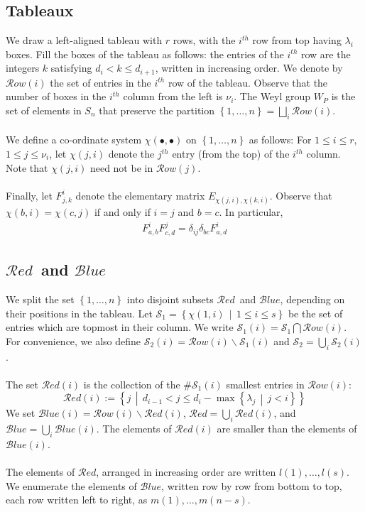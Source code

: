 \documentclass[paper=a4, fontsize=10pt]{amsart} %
\theoremstyle{plain}
\theoremstyle{definition}
\theoremstyle{remark}
\numberwithin{equation}{section} %
\numberwithin{figure}{section} %
\numberwithin{table}{section} %
\numberwithin{subsection}{section} %
\def\mid{\,\middle\vert\,}
\def\para{\ensuremath{P}}
\def\E{\ensuremath{E}}
\def\fij#1.#2.{\ensuremath{\chi(#2,#1)}}
\def\f#1.{\ensuremath{F^i_{#1}}}
\def\row{\ensuremath{\mathcal Row}}
\def\red{\ensuremath{\mathcal Red}}
\def\blue{\ensuremath{\mathcal Blue}}
\def\set{\ensuremath{\mathcal{S}}}
\def\Lambda{\ensuremath{d}}
\begin{document}
\subsection{Tableaux}
\label{41}
We draw a left-aligned tableau with $r$ rows, with the $i^{th}$ row from top having $\lambda_i$ boxes. 
Fill the boxes of the tableau as follows: the entries of the $i^{th}$ row are the integers $k$ satisfying $d_i<k\leq d_{i+1}$, written in increasing order.
We denote by $\row(i)$ the set of entries in the $i^{th}$ row of the tableau.
Observe that the number of boxes in the $i^{th}$ column from the left is $\nu_i$. 
The Weyl group $W_\para$ is the set of elements in $S_n$ that preserve the partition $\left\{1,\ldots,n\right\}=\bigsqcup\limits_i\row(i)$.
\\
\\
We define a co-ordinate system $\fij\bullet.\bullet.$  on $\left\{1,\ldots,n\right\}$ as follows:
For $1\leq i\leq r$, $1\leq j\leq\nu_i$, let $\fij i.j.$ denote the $j^{th}$ entry (from the top) of the $i^{th}$ column. 
Note that $\fij i.j.$ need not be in $\row(j)$.
\\
\\ 
Finally, let $\f j,k.$ denote the elementary matrix $\E_{\fij i.j.,\fij i.k.}$.
Observe that $\fij i.b.=\fij j.c.$ if and only if $i=j$ and $b=c$.
In particular, \begin{align}\label{delta}
    \f a,b.F^j_{c,d}=\delta_{ij}\delta_{bc}\f a,d.
\end{align}

\subsection{\red\ and \blue}
\label{redb4blue}
We split the set $\left\{1,\ldots,n\right\}$ into disjoint subsets \red\ and \blue, depending on their positions in the tableau. 
Let $\set_1=\left\{\fij i.1.\mid 1\leq i\leq s\right\}$ be the set of entries which are topmost in their column.
We write $\set_1(i)=\set_1\bigcap\row(i)$.
For convenience, we also define $\set_2(i)=\row(i)\backslash\set_1(i)$ and $\set_2=\bigcup\limits_i\set_2(i)$.
\\
\\
The set $\red(i)$ is the collection of the $\#\set_1(i)$ smallest entries in $\row(i)$: 
$$\red(i):=\left\{j\mid\Lambda_{i-1}<j\leq\Lambda_i-\max\left\{\lambda_j\mid j<i\right\}\right\}$$
We set $\blue(i)=\row(i)\backslash\red(i)$, $\red=\bigcup\limits_i\red(i)$, and $\blue=\bigcup\limits_i\blue(i)$.
The elements of $\red(i)$ are smaller than the elements of $\blue(i)$.
\\
\\
The elements of \red, arranged in increasing order are written $l(1),\ldots,l(s)$.
We enumerate the elements of $\blue$, written row by row from bottom to top, each row written left to right, as $m(1),\ldots,m(n-s)$.
\end{document}
